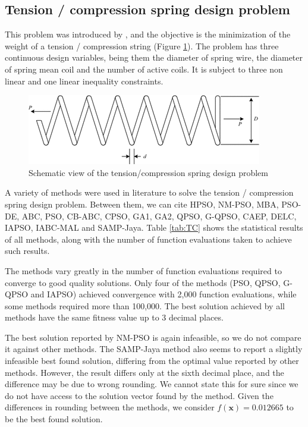 \subsection{Tension / compression spring design problem}

This problem was introduced by \cite{TC}, and the objective is the minimization of the weight of a tension / compression string (Figure \ref{fig:TC}). The problem has three continuous design variables, being them the diameter of spring wire, the diameter of spring mean coil and the number of active coils. It is subject to three non linear and one linear inequality constraints.

\begin{figure}[h]
\begin{center}
\includegraphics[scale=0.6]{Imgs/TC.png}
\end{center}
\captionsetup{justification=centering}
\caption{Schematic view of the tension/compression spring design problem}\label{fig:TC}
\end{figure}


A variety of methods were used in literature to solve the tension / compression spring design problem. Between them, we can cite HPSO, NM-PSO, MBA, PSO-DE, ABC, PSO, CB-ABC, CPSO, GA1, GA2, QPSO, G-QPSO, CAEP, DELC, IAPSO, IABC-MAL and SAMP-Jaya. Table \ref{tab:TC} shows the statistical results of all methods, along with the number of function evaluations taken to achieve such results.




The methods vary greatly in the number of function evaluations required to converge to good quality solutions. Only four of the methods (PSO, QPSO, G-QPSO and IAPSO) achieved convergence with 2,000 function evaluations, while some methods required more than 100,000. The best solution achieved by all methods have the same fitness value up to 3 decimal places.
 
The best solution reported by NM-PSO is again infeasible, so we do not compare it against other methods. The SAMP-Jaya method also seems to report a slightly infeasible best found solution, differing from the optimal value reported by other methods. However, the result differs only at the sixth decimal place, and the difference may be due to wrong rounding. We cannot state this for sure since we do not have access to the solution vector found by the method. Given the differences in rounding between the methods, we consider $f(\bm{x}) = 0.012665$ to be the best found solution.

